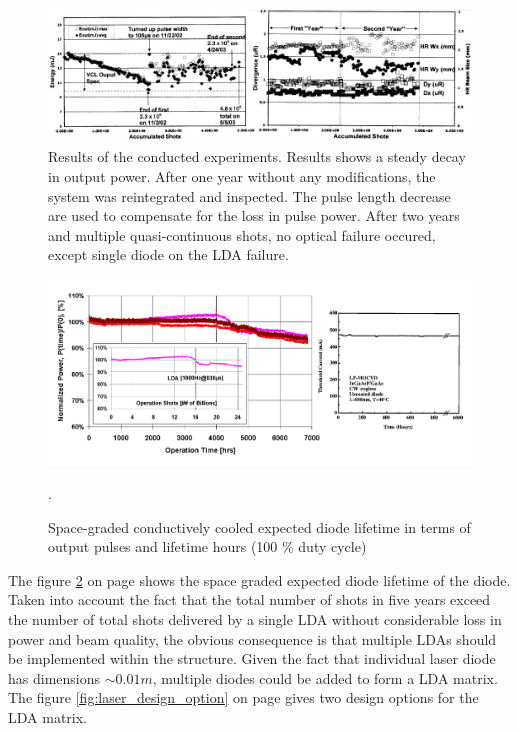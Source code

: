 \begin{figure}[ht!]
\centering
\includegraphics[scale=0.5]{chapters/img/Nd-YAG_reliability.jpg} 
\caption[Results of the conducted experiments]{Results of the conducted experiments. Results shows a steady decay in output power. After one year without any modifications, the system was reintegrated and inspected. The pulse length decrease are used to compensate for the loss in pulse power. After two years and multiple quasi-continuous shots, no optical failure occured, except single diode on the \acs{LDA} failure.}
\label{fig:ndyag_reliability}
\end{figure}

\begin{figure}[ht!]
\centering
\includegraphics[scale=0.4]{chapters/img/diode_lifetime.png} 
\caption{Space-graded conductively cooled expected diode lifetime in terms of output pulses and lifetime hours (100 \% duty cycle)}.
\label{fig:diode_life_time}
\end{figure}

The figure \ref{fig:diode_life_time} on page \pageref{fig:diode_life_time} shows the space graded expected diode lifetime of the diode. Taken into account the fact that the total number of shots in five years exceed the number of total shots delivered by a single \acs{LDA} without considerable loss in power and beam quality, the obvious consequence is that multiple \acp{LDA} should be implemented within the structure. Given the fact that individual \acs{laser} diode has dimensions $\sim0.01 m$, multiple diodes could be added to form a \acs{LDA} matrix. The figure \ref{fig:laser_design_option} on page \pageref{fig:laser_design_option} gives two design options for the \acs{LDA} matrix. 

